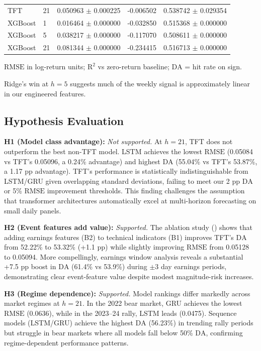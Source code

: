\documentclass[10pt,twocolumn]{article}
\newcommand{\rmse}{\ensuremath{\mathrm{RMSE}}}
\newcommand{\rTwo}{\ensuremath{\mathrm{R}^2}}
\newcommand{\da}{\ensuremath{\mathrm{DA}}}
\begin{document}
\begin{table}[t]
\begin{tabular}{llccc}
        TFT            & 21 & 0.050963 $\pm$ 0.000225 & -0.006502 & 0.538742 $\pm$ 0.029354 \\
        XGBoost        & 1  & 0.016464 $\pm$ 0.000000 & -0.032850 & 0.515368 $\pm$ 0.000000 \\
        XGBoost        & 5  & 0.038217 $\pm$ 0.000000 & -0.117070 & 0.508611 $\pm$ 0.000000 \\
        XGBoost        & 21 & 0.081344 $\pm$ 0.000000 & -0.234415 & 0.516713 $\pm$ 0.000000 \\
        \bottomrule
    \end{tabular}
    
    \vspace{0.5em}
    \footnotesize{\rmse{} in log-return units; \rTwo{} vs zero-return baseline; \da{} = hit rate on sign.}
\end{table}

Ridge's win at $h=5$ suggests much of the weekly signal is approximately linear in our engineered features.

\subsection{Hypothesis Evaluation}

\textbf{H1 (Model class advantage):} \textit{Not supported.} At $h=21$, TFT does not outperform the best non-TFT model. LSTM achieves the lowest \rmse{} (0.05084 vs TFT's 0.05096, a 0.24\% advantage) and highest \da{} (55.04\% vs TFT's 53.87\%, a 1.17 pp advantage). TFT's performance is statistically indistinguishable from LSTM/GRU given overlapping standard deviations, failing to meet our 2 pp \da{} or 5\% \rmse{} improvement thresholds. This finding challenges the assumption that transformer architectures automatically excel at multi-horizon forecasting on small daily panels.

\textbf{H2 (Event features add value):} \textit{Supported.} The ablation study () shows that adding earnings features (B2) to technical indicators (B1) improves TFT's \da{} from 52.22\% to 53.32\% (+1.1 pp) while slightly improving \rmse{} from 0.05128 to 0.05094. More compellingly, earnings window analysis reveals a substantial +7.5 pp boost in \da{} (61.4\% vs 53.9\%) during $\pm3$ day earnings periods, demonstrating clear event-feature value despite modest magnitude-risk increases.

\textbf{H3 (Regime dependence):} \textit{Supported.} Model rankings differ markedly across market regimes at $h=21$. In the 2022 bear market, GRU achieves the lowest \rmse{} (0.0636), while in the 2023--24 rally, LSTM leads (0.0475). Sequence models (LSTM/GRU) achieve the highest \da{} (56.23\%) in trending rally periods but struggle in bear markets where all models fall below 50\% \da{}, confirming regime-dependent performance patterns.
\end{document}
